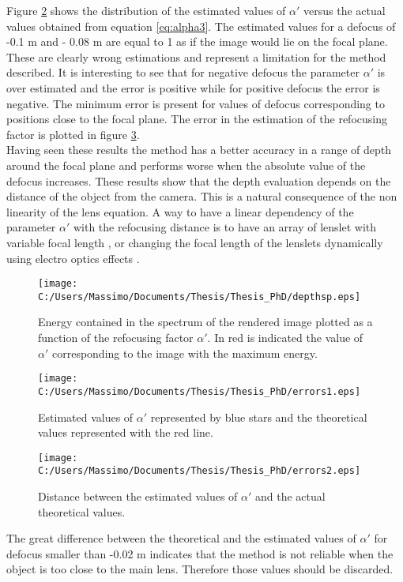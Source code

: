 Figure \ref{fig:error} shows the distribution of the estimated values of $ \alpha'$ versus the actual values obtained from equation \ref{eq:alpha3}.
 The estimated values for a defocus of -0.1 m and - 0.08 m are equal to 1 as if the image would lie on the focal plane. These are clearly wrong estimations and represent a limitation for the method described. It is interesting to see that for negative defocus the parameter $ \alpha'$ is over estimated and the error is positive while for positive defocus the error is negative. The minimum error is present for values of defocus corresponding to positions close to the focal plane. The error in the estimation of the refocusing factor is plotted in figure \ref{fig:error1}.
 \\
 Having seen these results the method has a better accuracy in a range of depth around the focal plane and performs worse when the absolute value of the defocus increases.
 These results show that the depth evaluation depends on the distance of the object from the camera. This is a natural consequence of the non linearity of the lens equation. A way to have a linear dependency of the parameter $ \alpha'$ with the refocusing distance is to have an array of lenslet with variable focal length \cite{wetzstein2011computational,georgiev2012multifocus}, or changing the focal length of the lenslets dynamically using electro optics effects \cite{ueda2008multi}.
 \begin{figure}[H]
 	\centering
 	\texttt{[image: C:/Users/Massimo/Documents/Thesis/Thesis\_PhD/depthsp.eps]}
 	\caption{\label{fig:maxima} Energy contained in the spectrum of the rendered image plotted as a function of the refocusing factor $ \alpha'$. In red is indicated the value of $ \alpha'$ corresponding to the image with the maximum energy. }
 \end{figure}
\begin{figure}[H]
	\centering
	\texttt{[image: C:/Users/Massimo/Documents/Thesis/Thesis\_PhD/errors1.eps]}
	\caption{\label{fig:error} Estimated values of $ \alpha'$ represented by blue stars and the theoretical values represented with the red line. }
\end{figure}
\begin{figure}[H]
	\centering
	\texttt{[image: C:/Users/Massimo/Documents/Thesis/Thesis\_PhD/errors2.eps]}
	\caption{\label{fig:error1} Distance between the estimated values of $ \alpha'$ and the actual theoretical values. }
\end{figure}
The great difference between the theoretical and the estimated values of $\alpha'$ for defocus smaller than -0.02 m indicates that the method is not reliable when the object is too close to the main lens. Therefore those values should be discarded.
